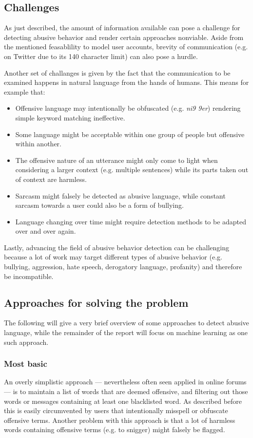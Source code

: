 \documentclass{proseminar}
\begin{document}
\subsection{Challenges}
As just described, the amount of information available can pose a challenge for detecting abusive behavior and render certain approaches nonviable. Aside from the mentioned feasablility to model user accounts, brevity of communication (e.g. on Twitter due to its 140 character limit) can also pose a hurdle.

Another set of challanges is given by the fact that the communication to be examined happens in natural language from the hands of humans. This means for example that:
\begin{itemize}
\item Offensive language may intentionally be obfuscated (e.g. \emph{ni9 9er}) rendering simple keyword matching ineffective.
\item Some language might be acceptable within one group of people but offensive within another.
\item The offensive nature of an utterance might only come to light when considering a larger context (e.g. multiple sentences) while its parts taken out of context are harmless.
\item Sarcasm might falsely be detected as abusive language, while constant sarcasm towards a user could also be a form of bullying.
\item Language changing over time might require detection methods to be adapted over and over again.
\end{itemize}

Lastly, advancing the field of abusive behavior detection can be challenging because a lot of work may target different types of abusive behavior (e.g. bullying, aggression, hate speech, derogatory language, profanity) and therefore be incompatible.


\subsection{Approaches for solving the problem}
The following will give a very brief overview of some approaches to detect abusive language, while the remainder of the report will focus on machine learning as one such approach.

\subsubsection{Most basic} An overly simplistic approach --- nevertheless often seen applied in online forums --- is to maintain a list of words that are deemed offensive, and filtering out those words or messages containing at least one blacklisted word. As described before this is easily circumvented by users that intentionally misspell or obfuscate offensive terms. Another problem with this approach is that a lot of harmless words containing offensive terms (e.g. to snigger) might falsely be flagged.
\end{document}
